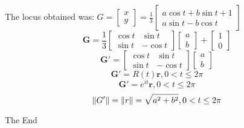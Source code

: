 \documentclass{beamer}
\let\vec\mathbf
\begin{document}
\begin{frame}
The locus obtained was: $G=\begin{bmatrix}
x\\y\end{bmatrix}=\frac{1}{3}\begin{bmatrix}a\cos t+b\sin t+1\\a\sin t-b\cos t \end{bmatrix}$
\[
\vec{G}=\frac{1}{3}\begin{bmatrix}\cos t & \sin t\\\sin t & -\cos t\end{bmatrix}\begin{bmatrix}a\\b\end{bmatrix}+\begin{bmatrix}1\\0\end{bmatrix}
\]
\[
\vec{G'}=\begin{bmatrix}\cos t & \sin t\\\sin t & -\cos t\end{bmatrix}\begin{bmatrix}a\\b\end{bmatrix}
\]
\[
\vec{G'}=R(t)\vec{r} ,  0<t\leq2\pi
\]
\[
\vec{G'}=e^{it}\vec{r} ,  0<t\leq2\pi
\]
\[
\norm{G'}=\norm{r}=\sqrt{a^{2}+b^{2}} ,  0<t\leq2\pi
\]
\end{frame}


\begin{frame}
\Huge{\centerline{The End}}
\end{frame}
\end{document}
